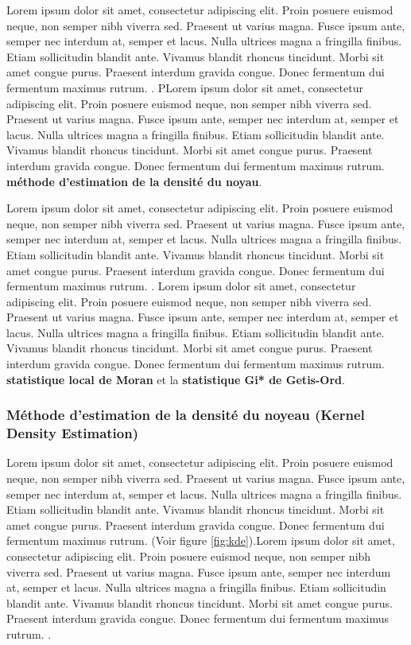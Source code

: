 \medskip

Lorem ipsum dolor sit amet, consectetur adipiscing elit. Proin posuere euismod neque, non semper nibh viverra sed. Praesent ut varius magna. Fusce ipsum ante, semper nec interdum at, semper et lacus. Nulla ultrices magna a fringilla finibus. Etiam sollicitudin blandit ante. Vivamus blandit rhoncus tincidunt. Morbi sit amet congue purus. Praesent interdum gravida congue. Donec fermentum dui fermentum maximus rutrum. \parencite{chang_introduction_2019}. PLorem ipsum dolor sit amet, consectetur adipiscing elit. Proin posuere euismod neque, non semper nibh viverra sed. Praesent ut varius magna. Fusce ipsum ante, semper nec interdum at, semper et lacus. Nulla ultrices magna a fringilla finibus. Etiam sollicitudin blandit ante. Vivamus blandit rhoncus tincidunt. Morbi sit amet congue purus. Praesent interdum gravida congue. Donec fermentum dui fermentum maximus rutrum. \textbf{méthode d'estimation de la densité du noyau}.

\medskip

Lorem ipsum dolor sit amet, consectetur adipiscing elit. Proin posuere euismod neque, non semper nibh viverra sed. Praesent ut varius magna. Fusce ipsum ante, semper nec interdum at, semper et lacus. Nulla ultrices magna a fringilla finibus. Etiam sollicitudin blandit ante. Vivamus blandit rhoncus tincidunt. Morbi sit amet congue purus. Praesent interdum gravida congue. Donec fermentum dui fermentum maximus rutrum. \parencite{chang_introduction_2019}. Lorem ipsum dolor sit amet, consectetur adipiscing elit. Proin posuere euismod neque, non semper nibh viverra sed. Praesent ut varius magna. Fusce ipsum ante, semper nec interdum at, semper et lacus. Nulla ultrices magna a fringilla finibus. Etiam sollicitudin blandit ante. Vivamus blandit rhoncus tincidunt. Morbi sit amet congue purus. Praesent interdum gravida congue. Donec fermentum dui fermentum maximus rutrum. \textbf{statistique local de Moran} et la \textbf{statistique Gi* de Getis-Ord}.

\medskip

\subsubsection{Méthode d'estimation de la densité du noyeau (Kernel Density Estimation)}
Lorem ipsum dolor sit amet, consectetur adipiscing elit. Proin posuere euismod neque, non semper nibh viverra sed. Praesent ut varius magna. Fusce ipsum ante, semper nec interdum at, semper et lacus. Nulla ultrices magna a fringilla finibus. Etiam sollicitudin blandit ante. Vivamus blandit rhoncus tincidunt. Morbi sit amet congue purus. Praesent interdum gravida congue. Donec fermentum dui fermentum maximus rutrum. \parencite{hart_kernel_2014} (Voir figure \ref{fig:kde}).Lorem ipsum dolor sit amet, consectetur adipiscing elit. Proin posuere euismod neque, non semper nibh viverra sed. Praesent ut varius magna. Fusce ipsum ante, semper nec interdum at, semper et lacus. Nulla ultrices magna a fringilla finibus. Etiam sollicitudin blandit ante. Vivamus blandit rhoncus tincidunt. Morbi sit amet congue purus. Praesent interdum gravida congue. Donec fermentum dui fermentum maximus rutrum. \parencite{gatrell_spatial_1996}.

